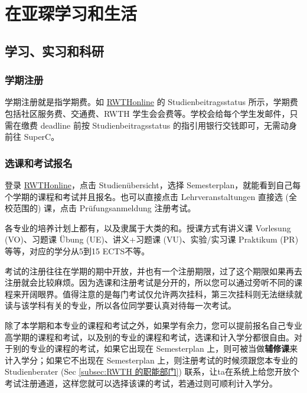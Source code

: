 
\chapter{在亚琛学习和生活}\label{chap:在亚琛学习和生活}

\section{学习、实习和科研}\label{sec:学习、实习和科研}

  \subsection{学期注册}\label{subsec:学期注册}

    学期注册就是指学期费。如 \href{https://online.rwth-aachen.de/}{RWTHonline} 的 Studienbeitragsstatus 所示，学期费包括社区服务费、交通费、RWTH 学生会会费等。学校会给每个学生发邮件，只需在缴费 deadline 前按 Studienbeitragsstatus 的指引用银行交钱即可，无需动身前往 SuperC。

  \subsection{选课和考试报名}\label{subsec:选课和考试报名}

    登录 \href{https://online.rwth-aachen.de/}{RWTHonline}，点击 Studienübersicht，选择 Semesterplan，就能看到自己每个学期的课程和考试并且报名。也可以直接点击 Lehrveranstaltungen 直接选 (全校范围的) 课，点击 Prüfungsanmeldung 注册考试。

    各专业的培养计划上都有，以及隶属于大类的和。授课方式有讲义课 Vorlesung (VO)、习题课 Übung (UE)、讲义+习题课 (VU)、实验/实习课 Praktikum (PR)等等，对应的学分从5到15 ECTS不等。

    考试的注册往往在学期的期中开放，并也有一个注册期限，过了这个期限如果再去注册就会比较麻烦。因为选课和注册考试是分开的，所以您可以通过旁听不同的课程来开阔眼界。值得注意的是每门考试仅允许两次挂科，第三次挂科则无法继续就读与该学科有关的专业，所以各位同学要认真对待每一次考试。

    除了本学期和本专业的课程和考试之外，如果学有余力，您可以提前报名自己专业高学期的课程和考试，以及别的专业的课程和考试，选课和计入学分都很自由。对于别的专业的课程的考试，如果它出现在 Semesterplan 上，则可被当做\textbf{辅修课}来计入学分；如果它不出现在 Semesterplan 上，则注册考试的时候须跟您本专业的 Studienberater (Sec \ref{subsec:RWTH 的职能部门}) 联系，让ta在系统上给您开放个考试注册通道，这样您就可以选择该课的考试，若通过则可顺利计入学分。

